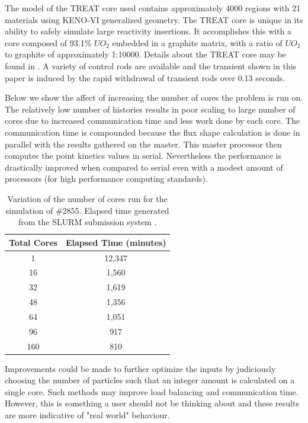 \documentclass{anstrans}
\begin{document}
The model of the TREAT core used contains approximately 4000 regions with 21 materials using KENO-VI generalized geometry.  The TREAT core is unique in its ability to safely simulate large reactivity insertions.  It accomplishes this with a core composed of 93.1\% $UO_2$ embedded in a graphite matrix, with a ratio of $UO_2$ to graphite of approximately 1:10000.  Details about the TREAT core may be found in \cite{bess2015baseline}.  A variety of control rods are available and the transient shown in this paper is induced by the rapid withdrawal of transient rods over 0.13 seconds. 

Below we show the affect of increasing the number of cores the problem is run on.  The relatively low number of histories results in poor scaling to large number of cores due to increased communication time and less work done by each core.  The communication time is compounded because the flux shape calculation is done in parallel with the results gathered on the master.  This master processor then computes the point kinetics values in serial.  Nevertheless the performance is drastically improved when compared to serial even with a modest amount of processors (for high performance computing standards).  
\begin{table}[h]
    \centering
    \begin{tabular}{c|c}
                    Total Cores  & Elapsed Time (minutes) \\
                    \hline 
                    1                  &   12,347            \\
                    16                 &   1,560             \\
                    32                 &   1,619              \\
                    48                 &   1,356              \\
                    64                 &   1,051             \\
                    96                 &   917             \\
                    160                &   810             \\
                    \hline
    \end{tabular}
    \caption{Variation of the number of cores run for the simulation of \#2855. Elapsed time generated from the SLURM submission system \cite{yoo2003slurm}. }
    \label{tab:parallel}
\end{table}
Improvements could be made to further optimize the inputs by judiciously choosing the number of particles such that an integer amount is calculated on a single core.  Such methods may improve load balancing and communication time.  However, this is something a user should not be thinking about and these results are more indicative of "real world" behaviour.
\end{document}
